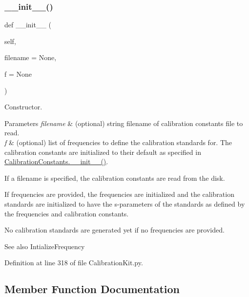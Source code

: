 \subsubsection{\texorpdfstring{\+\_\+\+\_\+init\+\_\+\+\_\+()}{\_\_init\_\_()}}
{\footnotesize\ttfamily def \+\_\+\+\_\+init\+\_\+\+\_\+ (\begin{DoxyParamCaption}\item[{}]{self,  }\item[{}]{filename = {\ttfamily None},  }\item[{}]{f = {\ttfamily None} }\end{DoxyParamCaption})}



Constructor. 


\begin{DoxyParams}{Parameters}
{\em filename} & (optional) string filename of calibration constants file to read. \\
\hline
{\em f} & (optional) list of frequencies to define the calibration standards for. The calibration constants are initialized to their default as specified in \hyperlink{classSignalIntegrity_1_1Measurement_1_1CalKit_1_1CalibrationKit_1_1CalibrationConstants_ae64f0875afe3067b97ba370b354b9213}{Calibration\+Constants.\+\_\+\+\_\+init\+\_\+\+\_\+()}.\\
\hline
\end{DoxyParams}
If a filename is specified, the calibration constants are read from the disk.

If frequencies are provided, the frequencies are initialized and the calibration standards are initialized to have the s-\/parameters of the standards as defined by the frequencies and calibration constants.

No calibration standards are generated yet if no frequencies are provided. \begin{DoxySeeAlso}{See also}
Intialize\+Frequency 
\end{DoxySeeAlso}


Definition at line 318 of file Calibration\+Kit.\+py.



\subsection{Member Function Documentation}
\mbox{\label{classSignalIntegrity_1_1Measurement_1_1CalKit_1_1CalibrationKit_1_1CalibrationKit_a068ffbf43377a9e28cccb8b6013772ea}} 
